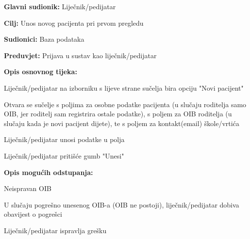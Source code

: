 					\noindent {}
					\begin{packed_item}
						
						\item \textbf{Glavni sudionik: }Liječnik/pedijatar
						\item  \textbf{Cilj:} Unos novog pacijenta pri prvom pregledu
						\item  \textbf{Sudionici:} Baza podataka
						\item  \textbf{Preduvjet:} Prijava u sustav kao liječnik/pedijatar
						\item  \textbf{Opis osnovnog tijeka:}
						
						\item[] \begin{packed_enum}
							
							\item Liječnik/pedijatar na izborniku s lijeve strane sučelja bira opciju "Novi pacijent"
							\item Otvara se sučelje s poljima za osobne podatke pacijenta (u slučaju roditelja samo OIB, jer roditelj sam registrira ostale podatke), s poljem za OIB roditelja (u slučaju kada je novi pacijent dijete), te s poljem za kontakt(email) škole/vrtića
							\item Liječnik/pedijatar unosi podatke u polja
							\item Liječnik/pedijatar pritišće gumb "Unesi"
						\end{packed_enum}
						
						\item  \textbf{Opis mogućih odstupanja:}
						
						\item[] \begin{packed_item}
							\item[3.a] Neispravan OIB
							\item[] \begin{packed_enum}
								\item U slučaju pogrešno unesenog OIB-a (OIB ne postoji), liječnik/pedijatar dobiva obavijest o pogrešci
								\item Liječnik/pedijatar ispravlja grešku
							\end{packed_enum}	
						\end{packed_item}
					\end{packed_item}
					
